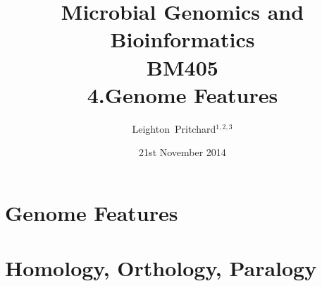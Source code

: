 

%



\title[Microbial Genomics and Bioinformatics: 4.Genome Features] %
{Microbial Genomics and \\ Bioinformatics \\
BM405 \\
4.Genome Features}
\author[Pritchard] %
{Leighton~Pritchard$^{1,2,3}$}
\date[21st November 2014] %
{21st November 2014}
\subject{Bioinformatics, Genomics, Bacteria, Sequencing, Microbiology, Microbes}





\frame[plain]{\titlepage}



\section{Genome Features}



%

\section{Homology, Orthology, Paralogy}
%
%
%

